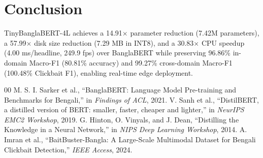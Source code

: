 \documentclass[conference]{IEEEtran}
\begin{document}
\section{Conclusion}
TinyBanglaBERT-4L achieves a 14.91$\times$ parameter reduction (7.42M parameters), a 57.99$\times$ disk size reduction (7.29 MB in INT8), and a 30.83$\times$ CPU speedup (4.00 ms/headline, 249.9 fps) over BanglaBERT while preserving 96.86\% in-domain Macro-F1 (80.81\% accuracy) and 99.27\% cross-domain Macro-F1 (100.48\% Clickbait F1), enabling real-time edge deployment.

\begin{thebibliography}{00}
 M. S. I. Sarker et al., ``BanglaBERT: Language Model Pre-training and Benchmarks for Bengali,'' in \textit{Findings of ACL}, 2021.
 V. Sanh et al., ``DistilBERT, a distilled version of BERT: smaller, faster, cheaper and lighter,'' in \textit{NeurIPS EMC2 Workshop}, 2019.
 G. Hinton, O. Vinyals, and J. Dean, ``Distilling the Knowledge in a Neural Network,'' in \textit{NIPS Deep Learning Workshop}, 2014.
 A. Imran et al., ``BaitBuster-Bangla: A Large-Scale Multimodal Dataset for Bengali Clickbait Detection,'' \textit{IEEE Access}, 2024.
\end{thebibliography}
\end{document}
